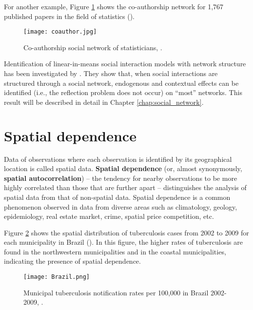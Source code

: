 \documentclass[11pt, A4paper, openany, uplatex]{book}
\begin{document}
For another example, Figure \ref{fig:coauthor} shows the co-authorship network for 1,767 published papers in the field of statistics (\cite{said2010author}).

\begin{figure}[h!]
	\begin{center}
		\texttt{[image: coauthor.jpg]}
		\caption{Co-authorship social network of statisticians, \cite{said2010author}.}
		\label{fig:coauthor}
	\end{center}
\end{figure}

Identification of linear-in-means social interaction models with network structure has been investigated by \cite{bramoulle2009identification}.
They show that, when social interactions are structured through a social network, endogenous and contextual effects can be identified (i.e., the reflection problem does not occur) on ``most'' networks.
This result will be described in detail in Chapter \ref{chap:social_network}.

\section{Spatial dependence}

Data of observations where each observation is identified by its geographical location is called spatial data. \textbf{Spatial dependence} (or, almost synonymously, \textbf{spatial autocorrelation}) -- the tendency for nearby observations to be more highly correlated than those that are further apart -- distinguishes the analysis of spatial data from that of non-spatial data.
Spatial dependence is a common phenomenon observed in data from diverse areas such as climatology, geology, epidemiology, real estate market, crime, spatial price competition, etc. 

Figure \ref{fig:Tuberculosis} shows the spatial distribution of tuberculosis cases from 2002 to 2009 for each municipality in Brazil (\cite{harling2014spatial}).
In this figure, the higher rates of tuberculosis are found in the northwestern municipalities and in the coastal municipalities, indicating the presence of spatial dependence.

\begin{figure}[h!]
	\begin{center}
		\texttt{[image: Brazil.png]}
		\caption{Municipal tuberculosis notification rates per 100,000 in Brazil 2002-2009, \cite{harling2014spatial}.}
		\label{fig:Tuberculosis}
	\end{center}
\end{figure}
\end{document}

